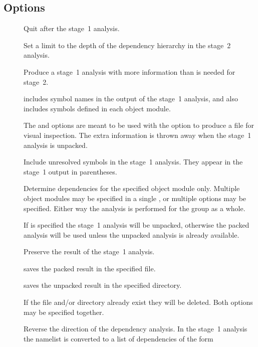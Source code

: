 \subsection*{Options}
 
\begin{description}
\item[]
   Quit after the stage~1 analysis.

\item[]
   Set a limit to the depth of the dependency hierarchy in the stage~2
   analysis.

\item[]
   Produce a stage~1 analysis with more information than is needed for
   stage~2.

    includes symbol names in the output of the stage~1 analysis, and
    also includes symbols defined in each object module.

   The  and  options are meant to be used with the 
   option to produce a file for visual inspection.  The extra information is
   thrown away when the stage~1 analysis is unpacked.

\item[]
   Include unresolved symbols in the stage~1 analysis.  They appear in the
   stage~1 output in parentheses.

\item[]
   Determine dependencies for the specified object module only.  Multiple
   object modules may be specified in a single , or multiple 
   options may be specified.  Either way the analysis is performed for the
   group as a whole.

   If  is specified the stage~1 analysis will be unpacked, otherwise
   the packed analysis will be used unless the unpacked analysis is already
   available.

\item[]
   Preserve the result of the stage~1 analysis.

    saves the packed result in the specified file.

    saves the unpacked result in the specified directory.

   If the file and/or directory already exist they will be deleted.  Both
   options may be specified together.

\item[]
   Reverse the direction of the dependency analysis.  In the stage~1 analysis
   the namelist is converted to a list of dependencies of the form


\end{description}
